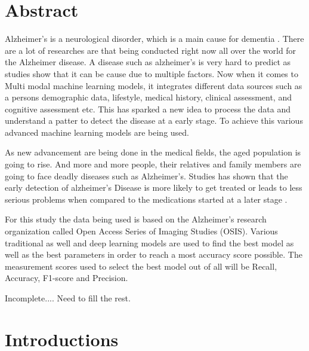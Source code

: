\documentclass[12pt,onecolumn]{report}
\begin{document}
\chapter*{Abstract}

Alzheimer's is a neurological disorder, which is a main cause for dementia \cite{Ewers2011}. There are a lot of researches are that being conducted right now all over the world for the Alzheimer disease. A disease such as alzheimer's is very hard to predict as studies show that it can be cause due to multiple factors. Now when it comes to Multi modal machine learning models, it integrates different data sources such as a persons demographic data, lifestyle, medical history, clinical assessment, and cognitive assessment etc. This has sparked a new idea to process the data and understand a patter to detect the disease at a early stage. To achieve this various advanced machine learning models are being used.

As new advancement are being done in the medical fields, the aged population is going to rise. And more and more people, their relatives and family members are going to face deadly diseases such as Alzheimer's. Studies has shown that the early detection of alzheimer's Disease is more likely to get treated or leads to less serious problems when compared to the medications started at a later stage \cite{Cummings2024}.

For this study the data being used is based on the Alzheimer's research organization called Open Access Series of Imaging Studies (OSIS). Various traditional as well and deep learning models are used to find the best model as well as the best parameters in order to reach a most accuracy score possible. The measurement scores used to select the best model out of all will be Recall, Accuracy, F1-score and Precision. 

Incomplete.... Need to fill the rest.



\tableofcontents
\listoffigures %
\listoftables  %

\chapter{Introductions}
\end{document}
